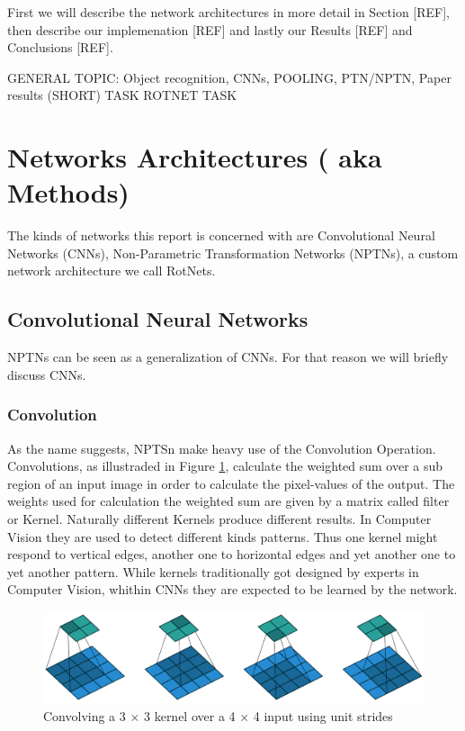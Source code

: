 \documentclass{llncs}
\begin{document}
First we will describe the network architectures in more detail in Section [REF], then describe our implemenation [REF] and lastly our Results [REF] and Conclusions [REF].

GENERAL TOPIC: Object recognition, CNNs, POOLING, PTN/NPTN, Paper results (SHORT) 
TASK
ROTNET TASK


\section{Networks Architectures ( aka Methods)}
The kinds of networks this report is concerned with are Convolutional Neural Networks (CNNs), Non-Parametric Transformation Networks (NPTNs), a custom network architecture we call RotNets.

\subsection{Convolutional Neural Networks}
NPTNs can be seen as a generalization of CNNs. For that reason we will briefly discuss CNNs.
\subsubsection{Convolution}
As the name suggests, NPTSn make heavy use of the Convolution Operation. Convolutions, as illustraded in Figure \ref{fig:conv}, calculate the weighted sum over a sub region of an input image in order to calculate the pixel-values of the output. The weights used for calculation the weighted sum are given by a matrix called filter or Kernel. Naturally different Kernels produce different results. In Computer Vision they are used to detect different kinds patterns. Thus one kernel might respond to vertical edges, another  one to horizontal edges and yet another one to yet another pattern. While kernels traditionally got designed by experts in Computer Vision, whithin CNNs they are expected to be learned by the network.
\begin{figure}
	\begin{center}
		\includegraphics[width=\textwidth]{result_images/Conv.png}
		\caption{Convolving a 3 × 3 kernel over a 4 × 4 input using unit strides}
		\label{fig:conv}
	\end{center}
\end{figure}
\end{document}
